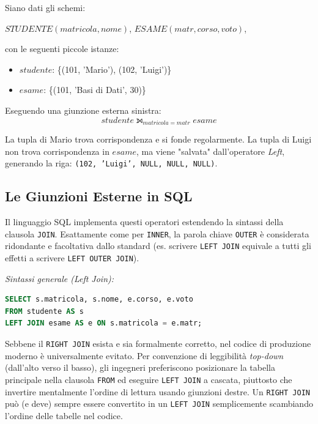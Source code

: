 \begin{example}
    Siano dati gli schemi: 

    \begin{center}
        $STUDENTE(matricola, nome)$, $ESAME(matr, corso, voto)$,
    \end{center}
    
    con le seguenti piccole istanze:
    \begin{itemize}
        \item $studente$: \{(101, 'Mario'), (102, 'Luigi')\}
        \item $esame$: \{(101, 'Basi di Dati', 30)\}
    \end{itemize}

    Eseguendo una giunzione esterna sinistra:
    $$ studente \leftouterjoin_{matricola = matr} esame $$

    La tupla di Mario trova corrispondenza e si fonde regolarmente. La tupla di Luigi non trova corrispondenza in $esame$, ma viene "salvata" dall'operatore \textit{Left}, generando la riga:
    \texttt{(102, 'Luigi', NULL, NULL, NULL)}.
\end{example}

\subsection{Le Giunzioni Esterne in SQL}

Il linguaggio SQL implementa questi operatori estendendo la sintassi della clausola \texttt{JOIN}. Esattamente come per \texttt{INNER}, la parola chiave \texttt{OUTER} è considerata ridondante e facoltativa dallo standard (es. scrivere \texttt{LEFT JOIN} equivale a tutti gli effetti a scrivere \texttt{LEFT OUTER JOIN}).

\textit{Sintassi generale (Left Join):}
\begin{lstlisting}[language=SQL, basicstyle=\ttfamily\small, keywordstyle=\color{blue}\bfseries]
SELECT s.matricola, s.nome, e.corso, e.voto
FROM studente AS s
LEFT JOIN esame AS e ON s.matricola = e.matr;
\end{lstlisting}

\begin{bestpractice}
Sebbene il \texttt{RIGHT JOIN} esista e sia formalmente corretto, nel codice di produzione moderno è universalmente evitato. Per convenzione di leggibilità \textit{top-down} (dall'alto verso il basso), gli ingegneri preferiscono posizionare la tabella principale nella clausola \texttt{FROM} ed eseguire \texttt{LEFT JOIN} a cascata, piuttosto che invertire mentalmente l'ordine di lettura usando giunzioni destre. Un \texttt{RIGHT JOIN} può (e deve) sempre essere convertito in un \texttt{LEFT JOIN} semplicemente scambiando l'ordine delle tabelle nel codice.
\end{bestpractice}

